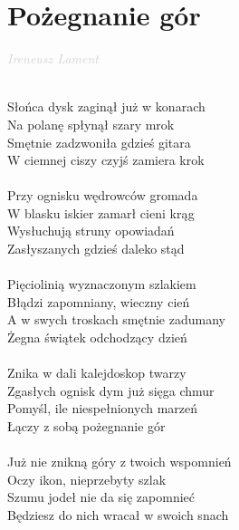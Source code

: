 \documentclass[a5paper, 10pt]{book}
\begin{document}
\section{Pożegnanie gór}\textcolor{lightgray}{\textit{Ireneusz Lament}}\\~\\
\begin{minipage}[t]{0.8\textwidth}
  Słońca dysk zaginął już w konarach	\\
  Na polanę spłynął szary mrok		\\
  Smętnie zadzwoniła gdzieś gitara	\\
  W ciemnej ciszy czyjś zamiera krok	\\
  \\
  Przy ognisku wędrowców gromada\\
  W blasku iskier zamarł cieni krąg\\
  Wysłuchują struny opowiadań\\
  Zasłyszanych gdzieś daleko stąd\\
  \\
  Pięciolinią wyznaczonym szlakiem				\\
  Błądzi zapomniany, wieczny cień				\\
  A w swych troskach smętnie zadumany			\\
  Żegna świątek odchodzący dzień			\\
  \\
  Znika w dali kalejdoskop twarzy\\
  Zgasłych ognisk dym już sięga chmur\\
  Pomyśl, ile niespełnionych marzeń\\
  Łączy z sobą pożegnanie gór\\
  \\
  Już nie znikną góry z twoich wspomnień\\
  Oczy ikon, nieprzebyty szlak\\
  Szumu jodeł nie da się zapomnieć\\
  Będziesz do nich wracał w swoich snach\\
\end{minipage}
\end{document}
